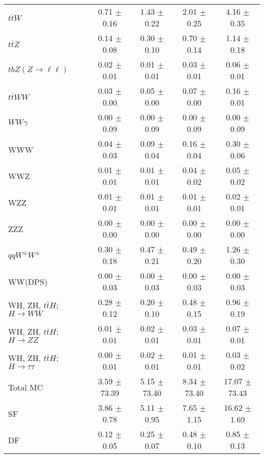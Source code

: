 \begin{tabular}{l|cccc}
                   $t\overline{t}W$ &  0.71 $\pm$  0.16 &  1.43 $\pm$  0.22 &  2.01 $\pm$  0.25 &  4.16 $\pm$  0.35 \\
                   $t\overline{t}Z$ &  0.14 $\pm$  0.08 &  0.30 $\pm$  0.10 &  0.70 $\pm$  0.14 &  1.14 $\pm$  0.18 \\
    $tbZ (Z \rightarrow \ell \ell)$ &  0.02 $\pm$  0.01 &  0.01 $\pm$  0.01 &  0.03 $\pm$  0.01 &  0.06 $\pm$  0.01 \\
                  $t\overline{t}WW$ &  0.03 $\pm$  0.00 &  0.05 $\pm$  0.00 &  0.07 $\pm$  0.00 &  0.16 $\pm$  0.01 \\
                         $WW\gamma$ &  0.00 $\pm$  0.09 &  0.00 $\pm$  0.09 &  0.00 $\pm$  0.09 &  0.00 $\pm$  0.09 \\
                                WWW &  0.04 $\pm$  0.03 &  0.09 $\pm$  0.04 &  0.16 $\pm$  0.04 &  0.30 $\pm$  0.06 \\
                                WWZ &  0.01 $\pm$  0.01 &  0.01 $\pm$  0.01 &  0.04 $\pm$  0.02 &  0.05 $\pm$  0.02 \\
                                WZZ &  0.01 $\pm$  0.01 &  0.01 $\pm$  0.01 &  0.01 $\pm$  0.01 &  0.02 $\pm$  0.01 \\
                                ZZZ &  0.00 $\pm$  0.00 &  0.00 $\pm$  0.00 &  0.00 $\pm$  0.00 &  0.00 $\pm$  0.00 \\
                 $qqW^{\pm}W^{\pm}$ &  0.30 $\pm$  0.18 &  0.47 $\pm$  0.21 &  0.49 $\pm$  0.20 &  1.26 $\pm$  0.30 \\
                            WW(DPS) &  0.00 $\pm$  0.03 &  0.00 $\pm$  0.03 &  0.00 $\pm$  0.03 &  0.00 $\pm$  0.03 \\
WH, ZH, $t\bar{t}H$; $H \rightarrow WW$ &  0.28 $\pm$  0.12 &  0.20 $\pm$  0.10 &  0.48 $\pm$  0.15 &  0.96 $\pm$  0.19 \\
WH, ZH, $t\bar{t}H$; $H \rightarrow ZZ$ &  0.01 $\pm$  0.01 &  0.02 $\pm$  0.01 &  0.03 $\pm$  0.01 &  0.07 $\pm$  0.01 \\
WH, ZH, $t\bar{t}H$; $H \rightarrow \tau\tau$ &  0.00 $\pm$  0.01 &  0.02 $\pm$  0.01 &  0.01 $\pm$  0.01 &  0.03 $\pm$  0.02 \\
\hline\hline
                           Total MC &  3.59 $\pm$ 73.39 &  5.15 $\pm$ 73.40 &  8.34 $\pm$ 73.40 & 17.07 $\pm$ 73.43 \\
\hline
                                 SF &  3.86 $\pm$  0.78 &  5.11 $\pm$  0.95 &  7.65 $\pm$  1.15 & 16.62 $\pm$  1.69 \\
                                 DF &  0.12 $\pm$  0.05 &  0.25 $\pm$  0.07 &  0.48 $\pm$  0.10 &  0.85 $\pm$  0.13 \\

\end{tabular}
